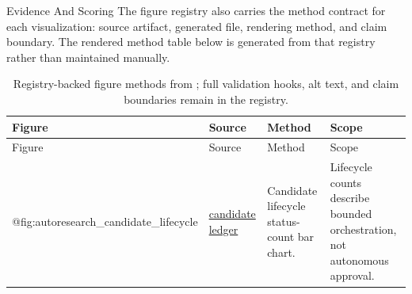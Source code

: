 \documentclass[
  ignorenonframetext,
]{beamer}
\begin{document}
\begin{frame}{Evidence And Scoring}
The figure registry also carries the method contract for each
visualization: source artifact, generated file, rendering method, and
claim boundary. The rendered method table below is generated from that
registry rather than maintained manually.

\begingroup\footnotesize

\begin{longtable}[]{@{}
  >{\raggedright\arraybackslash}p{}
  >{\raggedright\arraybackslash}p{}
  >{\raggedright\arraybackslash}p{}
  >{\raggedright\arraybackslash}p{}@{}}
\caption{Registry-backed figure methods from
\href{../figures/figure_registry.json}{\protect{}};
full validation hooks, alt text, and claim boundaries remain in the
registry.}\label{tbl:figure-methods}\tabularnewline
\toprule\noalign{}
\begin{minipage}[b]{\linewidth}\raggedright
Figure
\end{minipage} & \begin{minipage}[b]{\linewidth}\raggedright
Source
\end{minipage} & \begin{minipage}[b]{\linewidth}\raggedright
Method
\end{minipage} & \begin{minipage}[b]{\linewidth}\raggedright
Scope
\end{minipage} \\
\midrule\noalign{}
\endfirsthead
\toprule\noalign{}
\begin{minipage}[b]{\linewidth}\raggedright
Figure
\end{minipage} & \begin{minipage}[b]{\linewidth}\raggedright
Source
\end{minipage} & \begin{minipage}[b]{\linewidth}\raggedright
Method
\end{minipage} & \begin{minipage}[b]{\linewidth}\raggedright
Scope
\end{minipage} \\
\midrule\noalign{}
\endhead
@fig:autoresearch\_candidate\_lifecycle &
\href{../data/ml_candidate_ledger.json}{candidate ledger} & Candidate
lifecycle status-count bar chart. & Lifecycle counts describe bounded
orchestration, not autonomous approval. \\

\end{longtable}
\end{frame}
\end{document}
